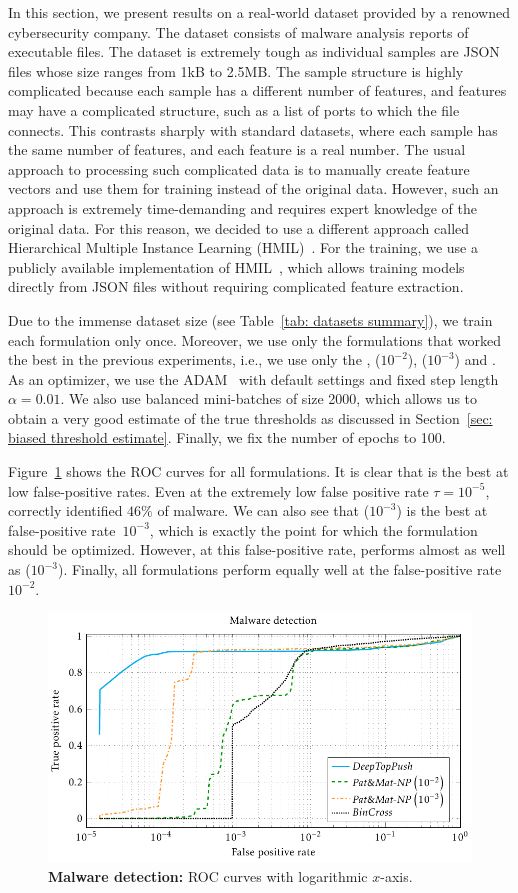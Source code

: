 In this section, we present results on a real-world dataset provided by a renowned cybersecurity company. The dataset consists of malware analysis reports of executable files. The dataset is extremely tough as individual samples are JSON files whose size ranges from 1kB to 2.5MB. The sample structure is highly complicated because each sample has a different number of features, and features may have a complicated structure, such as a list of ports to which the file connects. This contrasts sharply with standard datasets, where each sample has the same number of features, and each feature is a real number. The usual approach to processing such complicated data is to manually create feature vectors and use them for training instead of the original data. However, such an approach is extremely time-demanding and requires expert knowledge of the original data. For this reason, we decided to use a different approach called Hierarchical Multiple Instance Learning (HMIL)~\cite{pevny2017using}. For the training, we use a publicly available implementation of HMIL~\cite{mandlik2021mill, mandlik2022jsongrinder}, which allows training models directly from JSON files without requiring complicated feature extraction.

Due to the immense dataset size (see Table~\ref{tab: datasets summary}), we train each formulation only once. Moreover, we use only the formulations that worked the best in the previous experiments, i.e., we use only the \BaseLine, \PatMatNP($10^{-2}$), \PatMatNP($10^{-3}$) and \DeepTopPush. As an optimizer, we use the ADAM~\cite{kingma2014adam} with default settings and fixed step length~$\alpha = 0.01.$ We also use balanced mini-batches of size 2000, which allows us to obtain a very good estimate of the true thresholds as discussed in Section~\ref{sec: biased threshold estimate}. Finally, we fix the number of epochs to 100.

Figure~\ref{fig: malware detection} shows the ROC curves for all formulations. It is clear that \DeepTopPush is the best at low false-positive rates. Even at the extremely low false positive rate $\tau=10^{-5}$, \DeepTopPush correctly identified $46\%$ of malware. We can also see that \PatMatNP($10^{-3}$) is the best at false-positive rate~$10^{-3}$, which is exactly the point for which the formulation should be optimized. However, at this false-positive rate, \DeepTopPush performs almost as well as \PatMatNP($10^{-3}$). Finally, all formulations perform equally well at the false-positive rate~$10^{-2}$.

\begin{figure}
  \centering
  \includegraphics{images/malware_detection.pdf}
  \caption{\textbf{Malware detection:} ROC curves with logarithmic $x$-axis.}
  \label{fig: malware detection}
\end{figure}
\hfill
